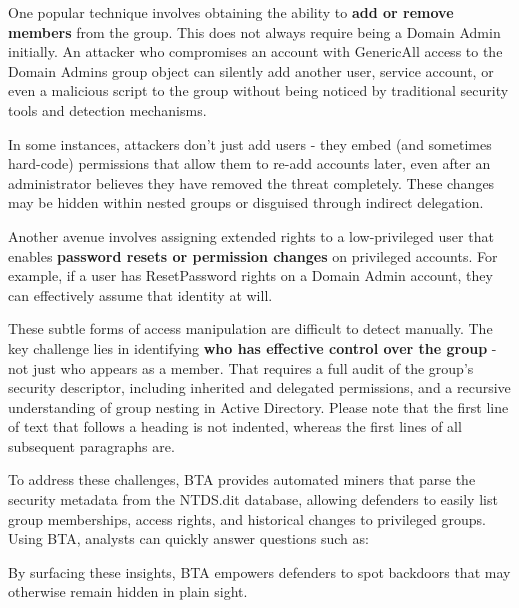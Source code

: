 One popular technique involves obtaining the ability to \textbf{add or remove members} from the group. This does not always require being a Domain Admin initially. An attacker who compromises an account with GenericAll access to the Domain Admins group object can silently add another user, service account, or even a malicious script to the group without being noticed by traditional security tools and detection mechanisms.

In some instances, attackers don't just add users - they embed (and sometimes hard-code) permissions that allow them to re-add accounts later, even after an administrator believes they have removed the threat completely. These changes may be hidden within nested groups or disguised through indirect delegation.

Another avenue involves assigning extended rights to a low-privileged user that enables \textbf{password resets or permission changes} on privileged accounts. For example, if a user has ResetPassword rights on a Domain Admin account, they can effectively assume that identity at will.

These subtle forms of access manipulation are difficult to detect manually. The key challenge lies in identifying \textbf{who has effective control over the group} - not just who appears as a member. That requires a full audit of the group's security descriptor, including inherited and delegated permissions, and a recursive understanding of group nesting in Active Directory.
Please note that the first line of text that follows a heading is not indented, whereas the first lines of all subsequent paragraphs are.

To address these challenges, BTA provides automated miners that parse the security metadata from the NTDS.dit database, allowing defenders to easily list group memberships, access rights, and historical changes to privileged groups. Using BTA, analysts can quickly answer questions such as:

By surfacing these insights, BTA empowers defenders to spot backdoors that may otherwise remain hidden in plain sight. 

